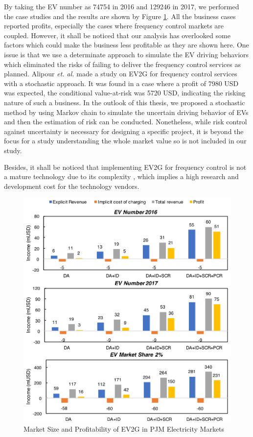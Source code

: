 By taking the EV number as \num{74754} in 2016 and \num{129246} in 2017, we performed the case studies and the results are shown by Figure \ref{fig:Germany_EV}. All the business cases reported profits, especially the cases where frequency control markets are coupled. However, it shall be noticed that our analysis has overlooked some factors which could make the business less profitable as they are shown here. One issue is that we use a determinate approach to simulate the EV driving behaviors which eliminated the risks of failing to deliver the frequency control services as planned. Alipour \textit{et. al.}\cite{Alipour2017} made a study on EV2G for frequency control services with a stochastic approach. It was found in a case where a profit of 7980 USD was expected, the conditional value-at-risk was 5720 USD, indicating the risking nature of such a business. In the outlook of this thesis, we proposed a stochastic method by using Markov chain to simulate the uncertain driving behavior of EVs and then the estimation of risk can be conducted. Nonetheless, while risk control against uncertainty is necessary for designing a specific project, it is beyond the focus for a study understanding the whole market value so is not included in our study.

Besides, it shall be noticed that implementing EV2G for frequency control is not a mature technology due to its complexity\cite{Peng2017}\cite{Shafie-Khah2015} \cite{Bessa2014}\cite{Bessa2013}, which implies a high research and development cost for the technology vendors. 

\begin{figure}[h!]
	\centering
	\includegraphics[width=0.95\linewidth]{Figures/Germany_EV_profit}
	\caption{Market Size and Profitability of EV2G in PJM Electricity Markets}
	\label{fig:Germany_EV}
\end{figure}


